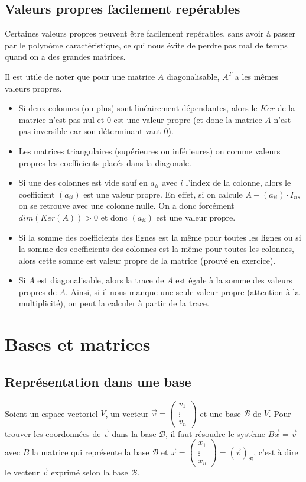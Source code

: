 \documentclass[10pt,a4paper]{book}
\begin{document}
\section{Valeurs propres facilement repérables}
Certaines valeurs propres peuvent être facilement repérables, sans avoir à passer par le polynôme caractéristique, ce qui nous évite de perdre pas mal de temps quand on a des grandes matrices. \par 
Il est utile de noter que pour une matrice $A$ diagonalisable, $A^T$ a les mêmes valeurs propres.
\begin{itemize}
\item Si deux colonnes (ou plus) sont linéairement dépendantes, alors le $Ker$ de la matrice n'est pas nul et 0 est une valeur propre (et donc la matrice $A$ n'est pas inversible car son déterminant vaut 0). 
\item Les matrices triangulaires (supérieures ou inférieures) on comme valeurs propres les coefficients placés dans la diagonale.
\item Si une des colonnes est vide sauf en $a_{ii}$ avec $i$ l'index de la colonne, alors le coefficient $(a_{ii})$ est une valeur propre. En effet, si on calcule $A-(a_{ii})\cdot I_n$, on se retrouve avec une colonne nulle. On a donc forcément $dim(Ker(A)) > 0$ et donc $(a_{ii})$ est une valeur propre. 
\item Si la somme des coefficients des lignes est la même pour toutes les lignes ou si la somme des coefficients des colonnes est la même pour toutes les colonnes, alors cette somme est valeur propre de la matrice (prouvé en exercice).
\item Si $A$ est diagonalisable, alors la trace de $A$ est égale à la somme des valeurs propres de $A$. Ainsi, si il nous manque une seule valeur propre (attention à la multiplicité), on peut la calculer à partir de la trace.
\end{itemize}

\chapter{Bases et matrices}
\section{Représentation dans une base}
Soient un espace vectoriel $V$, un vecteur $\vec{v} = \begin{pmatrix} v_1 \\ \vdots \\ v_n \end{pmatrix}$ et une base $\mathcal{B}$ de $V$. Pour trouver les coordonnées de $\vec{v}$ dans la base $\mathcal{B}$, il faut résoudre le système $B\vec{x} = \vec{v}$ avec $B$ la matrice qui représente la base $\mathcal{B}$ et $\vec{x} = \begin{pmatrix} x_1 \\ \vdots \\ x_n \end{pmatrix} = (\vec{v})_\mathcal{B}$, c'est à dire le vecteur $\vec{v}$ exprimé selon la base $\mathcal{B}$.
\end{document}

